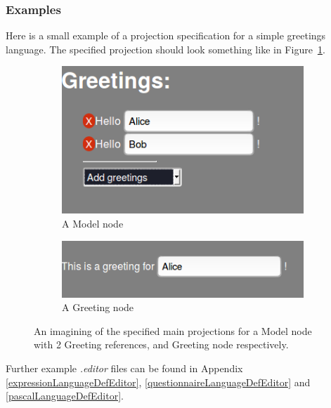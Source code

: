\documentclass{article}
\begin{document}
{\subsubsection{Examples}
Here is a small example of a projection specification for a simple greetings language. The specified projection should look something like in Figure~\ref{fig:greetingProjection}.

\begin{figure}[t!]
  \centering
  \begin{subfigure}[b]{0.45\linewidth}
    \includegraphics[width=\linewidth]{./Screenshots/greetingsProjection1.png}
    \caption{A Model node}
  \end{subfigure}
  \begin{subfigure}[b]{0.45\linewidth}
	\includegraphics[width=\linewidth]{./Screenshots/greetingsProjection2.png}
    \caption{A Greeting node}
  \end{subfigure}
  \caption{An imagining of the specified main projections for a Model node with 2 Greeting references, and Greeting node respectively.}
  \label{fig:greetingProjection}
\end{figure}

Further example \emph{.editor} files can be found in Appendix \ref{expressionLanguageDefEditor}, \ref{questionnaireLanguageDefEditor} and \ref{pascalLanguageDefEditor}.


}
\end{document}
